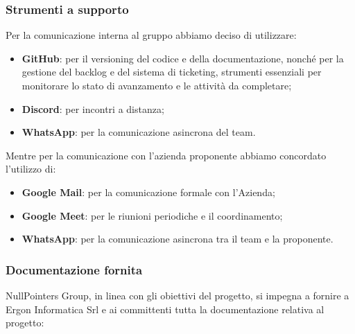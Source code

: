 	\subsubsection{Strumenti a supporto}
	\label{sec:strumenti-supporto}
	Per la comunicazione interna al gruppo abbiamo deciso di utilizzare: \vspace{-0.5em}
	\begin{itemize}[itemsep=3pt, parsep=1pt, label=$\scriptstyle\bullet$]
		\item \textbf{GitHub}: per il versioning del codice e della documentazione, nonché per la gestione del backlog e del sistema di ticketing, strumenti essenziali per monitorare lo stato di avanzamento e le attività da completare;
	    \item \textbf{Discord}: per incontri a distanza;
	    \item \textbf{WhatsApp}: per la comunicazione asincrona del team.
	\end{itemize}
	Mentre per la comunicazione con l'azienda proponente abbiamo concordato l'utilizzo di: \vspace{-0.5em}
	\begin{itemize}[itemsep=3pt, parsep=1pt, label=$\scriptstyle\bullet$]
	    \item \textbf{Google Mail}: per la comunicazione formale con l'Azienda;
	    \item \textbf{Google Meet}: per le riunioni periodiche e il coordinamento;
	    \item \textbf{WhatsApp}: per la comunicazione asincrona tra il team e la proponente.
	\end{itemize}

	\subsubsection{Documentazione fornita}
	NullPointers Group, in linea con gli obiettivi del progetto, si impegna a fornire a Ergon Informatica Srl e ai committenti tutta la documentazione relativa al progetto:

